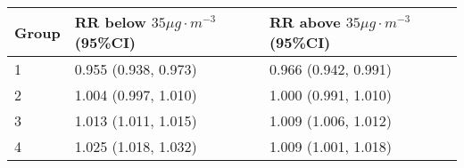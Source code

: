 \begin{tabular}{lll}
  \hline
Group & RR below $35 \mu g \cdot m^{-3}$ (95\%CI) & RR above $35 \mu g \cdot m^{-3}$ (95\%CI) \\ 
  \hline
   1 & 0.955 (0.938, 0.973) & 0.966 (0.942, 0.991) \\ 
     2 & 1.004 (0.997, 1.010) & 1.000 (0.991, 1.010) \\ 
     3 & 1.013 (1.011, 1.015) & 1.009 (1.006, 1.012) \\ 
     4 & 1.025 (1.018, 1.032) & 1.009 (1.001, 1.018) \\ 
   \hline
\end{tabular}

